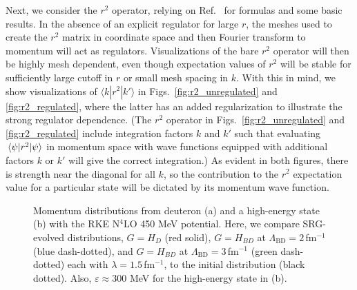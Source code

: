 \documentclass[10pt,aps,prc,floatfix,twocolumn,nofootinbib]{revtex4-1}
\newcommand{\LambdaBD}{{\Lambda_{\text{BD}}}}
\begin{document}
Next, we consider the $r^2$ operator, relying on Ref.~\cite{Anderson:2010aq} for formulas and some basic results.
In the absence of an explicit regulator for large $r$, the meshes used to create the $r^2$ matrix in coordinate space and then Fourier transform to momentum will act as regulators. 
Visualizations of the bare $r^2$ operator will then be highly mesh dependent, even though 
expectation values of $r^2$ will be stable for sufficiently large cutoff in $r$ or small mesh spacing in $k$.
With this in mind, we show visualizations of $\langle k | r^2 | k'\rangle$ in Figs.~\ref{fig:r2_unregulated} and \ref{fig:r2_regulated}, where the latter has an added regularization to illustrate the strong regulator dependence.
(The $r^2$ operator in Figs.~\ref{fig:r2_unregulated} and \ref{fig:r2_regulated} include integration factors $k$ and $k'$ such that evaluating $\mel{\psi}{r^2}{\psi}$ in momentum space with wave functions equipped with additional factors $k$ or $k'$ will give the correct integration.)
As evident in both figures, there is strength near the diagonal for all $k$, so the contribution to the $r^2$ expectation value for a particular state will be dictated by its momentum wave function.

%
\begin{figure}[tbh]
	\quad
	\caption{Momentum distributions from deuteron (a) and a high-energy state (b) with the RKE N$^4$LO 450 MeV potential. Here, we compare SRG-evolved distributions, $G=H_D$ (red solid), $G=H_{BD}$ at $\LambdaBD=2$\,fm$^{-1}$ (blue dash-dotted), and $G=H_{BD}$ at $\LambdaBD=3$\,fm$^{-1}$ (green dash-dotted) each with $\lambda=1.5$\,fm$^{-1}$, to the initial distribution (black dotted). Also, $\varepsilon \approx 300$ MeV for the high-energy state in (b).}
	\label{fig:momentum_distributions_RKE}
\end{figure}
%
\end{document}
